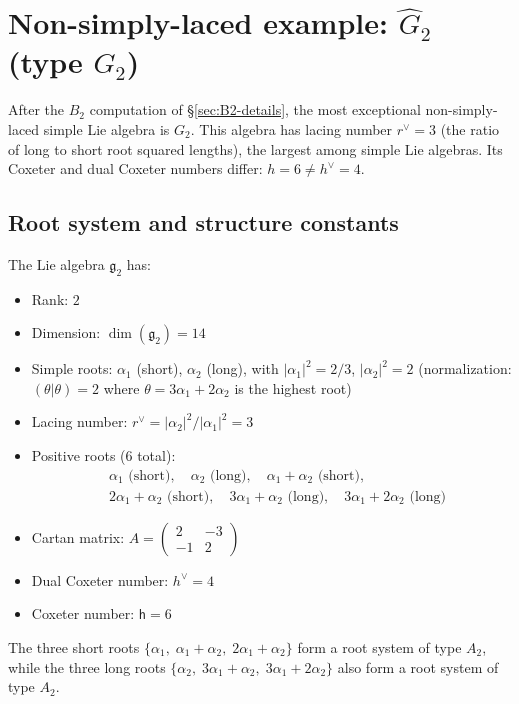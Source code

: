 \section{\texorpdfstring{Non-simply-laced example: $\widehat{G}_2$
(type $G_2$)}{Non-simply-laced example: G-2 (type G-2)}}
\label{sec:G2-details}

After the $B_2$ computation of \S\ref{sec:B2-details},
the most exceptional non-simply-laced simple Lie algebra is
$G_2$. This algebra has lacing number $r^\vee = 3$
(the ratio of long to short root squared lengths), the largest
among simple Lie algebras. Its Coxeter and dual Coxeter numbers
differ: $h = 6 \neq h^\vee = 4$.

\subsection{Root system and structure constants}

\begin{computation}\label{comp:G2-roots}
The Lie algebra $\mathfrak{g}_2$ has:
\begin{itemize}
\item Rank: $2$
\item Dimension: $\dim(\mathfrak{g}_2) = 14$
\item Simple roots: $\alpha_1$ (short), $\alpha_2$ (long), with
$|\alpha_1|^2 = 2/3$, $|\alpha_2|^2 = 2$
(normalization: $(\theta|\theta) = 2$ where
$\theta = 3\alpha_1 + 2\alpha_2$ is the highest root)
\item Lacing number: $r^\vee = |\alpha_2|^2/|\alpha_1|^2 = 3$
\item Positive roots ($6$ total):
\begin{align*}
&\alpha_1 \text{ (short)}, \quad
\alpha_2 \text{ (long)}, \quad
\alpha_1 + \alpha_2 \text{ (short)}, \\
&2\alpha_1 + \alpha_2 \text{ (short)}, \quad
3\alpha_1 + \alpha_2 \text{ (long)}, \quad
3\alpha_1 + 2\alpha_2 \text{ (long)}
\end{align*}
\item Cartan matrix:
$A = \begin{pmatrix} 2 & -3 \\ -1 & 2 \end{pmatrix}$
\item Dual Coxeter number: $h^\vee = 4$
\item Coxeter number: $\mathsf{h} = 6$
\end{itemize}
The three short roots $\{\alpha_1,\; \alpha_1+\alpha_2,\;
2\alpha_1+\alpha_2\}$ form a root system of type $A_2$,
while the three long roots
$\{\alpha_2,\; 3\alpha_1+\alpha_2,\; 3\alpha_1+2\alpha_2\}$
also form a root system of type $A_2$.
\end{computation}

